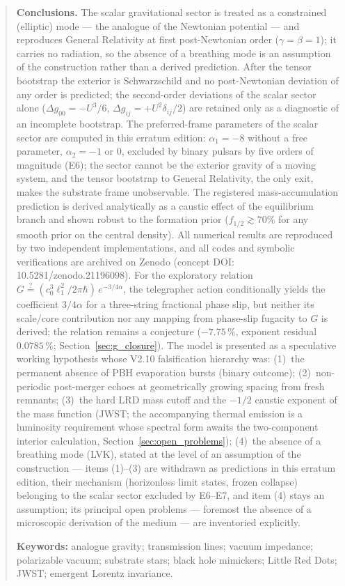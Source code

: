 \documentclass[11pt,a4paper]{article}
\theoremstyle{plain}
\theoremstyle{remark}
\begin{document}
\begin{abstract}
\noindent\textbf{Conclusions.} The scalar gravitational sector is treated as a constrained (elliptic) mode --- the analogue of the Newtonian potential --- and reproduces General Relativity at first post-Newtonian order ($\gamma = \beta = 1$); it carries no radiation, so the absence of a breathing mode is an assumption of the construction rather than a derived prediction. After the tensor bootstrap the exterior is Schwarzschild and no post-Newtonian deviation of any order is predicted; the second-order deviations of the scalar sector alone ($\Delta g_{00} = -U^3/6$, $\Delta g_{ij} = +U^2\delta_{ij}/2$) are retained only as a diagnostic of an incomplete bootstrap. The preferred-frame parameters of the scalar sector are computed in this erratum edition: $\alpha_1 = -8$ without a free parameter, $\alpha_2 = -1$ or $0$, excluded by binary pulsars by five orders of magnitude (E6); the sector cannot be the exterior gravity of a moving system, and the tensor bootstrap to General Relativity, the only exit, makes the substrate frame unobservable. The registered mass-accumulation prediction is derived analytically as a caustic effect of the equilibrium branch and shown robust to the formation prior ($f_{1/2} \gtrsim 70\%$ for any smooth prior on the central density). All numerical results are reproduced by two independent implementations, and all codes and symbolic verifications are archived on Zenodo (concept DOI: 10.5281/zenodo.21196098). For the exploratory relation $G \stackrel{?}{=} (c_0^3\ell_1^2/2\pi\hbar)\,e^{-3/4\alpha}$, the telegrapher action conditionally yields the coefficient $3/4\alpha$ for a three-string fractional phase slip, but neither its scale/core contribution nor any mapping from phase-slip fugacity to $G$ is derived; the relation remains a conjecture ($-7.75\,\%$, exponent residual $0.0785\,\%$; Section~\ref{sec:g_closure}). The model is presented as a speculative working hypothesis whose V2.10 falsification hierarchy was: (1)~the permanent absence of PBH evaporation bursts (binary outcome); (2)~non-periodic post-merger echoes at geometrically growing spacing from fresh remnants; (3)~the hard LRD mass cutoff and the $-1/2$ caustic exponent of the mass function (JWST; the accompanying thermal emission is a luminosity requirement whose spectral form awaits the two-component interior calculation, Section~\ref{sec:open_problems}); (4)~the absence of a breathing mode (LVK), stated at the level of an assumption of the construction --- items (1)--(3) are withdrawn as predictions in this erratum edition, their mechanism (horizonless limit states, frozen collapse) belonging to the scalar sector excluded by E6--E7, and item (4) stays an assumption; its principal open problems --- foremost the absence of a microscopic derivation of the medium --- are inventoried explicitly.

\medskip
\noindent\textbf{Keywords:} analogue gravity; transmission lines; vacuum impedance; polarizable vacuum; substrate stars; black hole mimickers; Little Red Dots; JWST; emergent Lorentz invariance.
\end{abstract}
\end{document}
